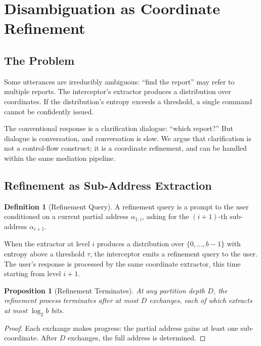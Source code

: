 \documentclass[11pt,twocolumn,a4paper]{article}
\newtheorem{proposition}[theorem]{Proposition}
\theoremstyle{definition}
\newtheorem{definition}[theorem]{Definition}
\theoremstyle{remark}
\begin{document}
\section{Disambiguation as Coordinate Refinement}
\label{sec:disambig}

\subsection{The Problem}

Some utterances are irreducibly ambiguous: ``find the report'' may refer to multiple reports. The interceptor's extractor produces a distribution over coordinates. If the distribution's entropy exceeds a threshold, a single command cannot be confidently issued.

The conventional response is a clarification dialogue: ``which report?'' But dialogue is conversation, and conversation is slow. We argue that clarification is not a control-flow construct; it is a coordinate refinement, and can be handled within the same mediation pipeline.

\subsection{Refinement as Sub-Address Extraction}

\begin{definition}[Refinement Query]
A refinement query is a prompt to the user conditioned on a current partial address $\alpha_{1:i}$, asking for the $(i+1)$-th sub-address $\alpha_{i+1}$.
\end{definition}

When the extractor at level $i$ produces a distribution over $\{0,\ldots,b-1\}$ with entropy above a threshold $\tau$, the interceptor emits a refinement query to the user. The user's response is processed by the same coordinate extractor, this time starting from level $i+1$.

\begin{proposition}[Refinement Terminates]
\label{prop:ref-term}
At any partition depth $D$, the refinement process terminates after at most $D$ exchanges, each of which extracts at most $\log_2 b$ bits.
\end{proposition}

\begin{proof}
Each exchange makes progress: the partial address gains at least one sub-coordinate. After $D$ exchanges, the full address is determined.
\end{proof}
\end{document}
